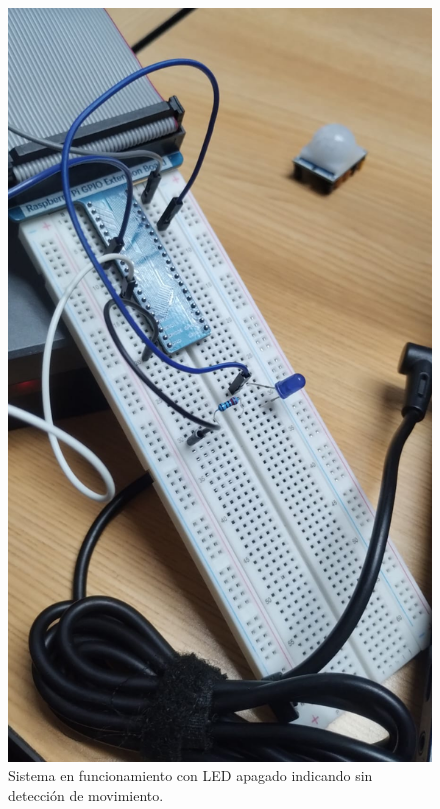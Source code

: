 \begin{figure}[h]
	\centering
	\includegraphics[width=0.5\textheight]{imagenes/3.jpg}
	\caption{Sistema en funcionamiento con LED apagado indicando sin detección de movimiento.}
	\label{fig:deteccionOFF}
\end{figure}

